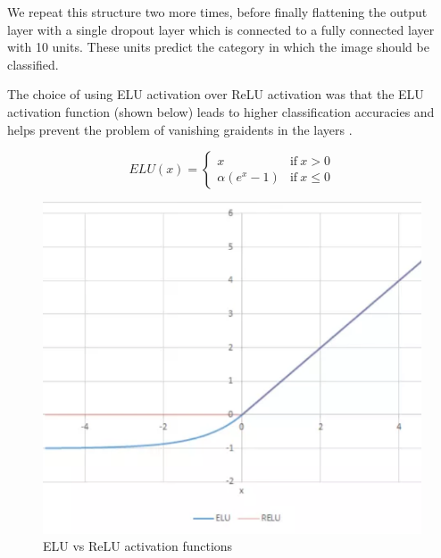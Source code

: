 \documentclass[12pt]{article}
\begin{document}
We repeat this structure two more times, before finally flattening the output layer with a single dropout layer which is connected to a fully connected layer with 10 units. These units predict the category in which the image should be classified.

The choice of using ELU activation over ReLU activation was that the ELU activation function (shown below) leads to higher classification accuracies and helps prevent the problem of vanishing graidents in the layers \cite{clevert2015fast}.

\begin{figure}[htbp]
  \centering
  \begin{minipage}{0.4\textwidth}
    \centering
    \begin{equation}
      ELU(x) = \begin{cases} x                 & \text{if}~x > 0    \\
        \alpha ( e^x - 1) & \text{if}~x \leq 0\end{cases}
    \end{equation}
  \end{minipage}\hfill
  \begin{minipage}{0.4\textwidth}
    \centering
    \includegraphics[width=1\textwidth]{results/eluvsrelu.png}
    \caption{ELU vs ReLU activation functions
      \label{fig:eluvsrelu}
    }
  \end{minipage}
\end{figure}
\newpage
\end{document}
